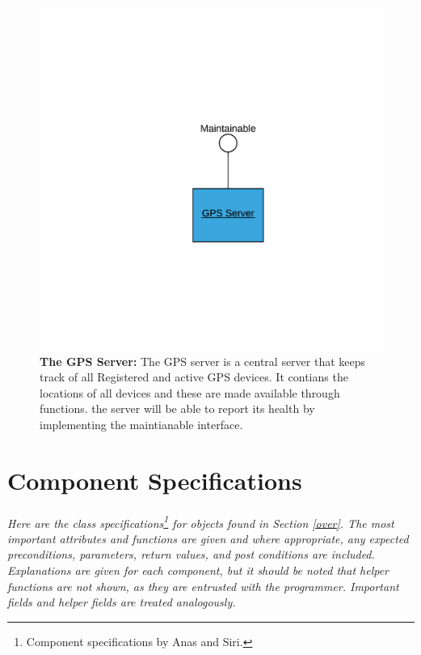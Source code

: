 \documentclass[12pt]{article}
\begin{document}
\begin{figure}[H]
    \centerline{\includegraphics[scale=.20]{GPSServer.png}}
    \caption{\textbf{The GPS Server: }The GPS server is a central server that keeps track of all Registered and active GPS devices. 
It contians the locations of all devices and these are made available through functions. the server will be able 
to report its health by implementing the maintianable interface.}
    \label{fig:GPSServer}
\end{figure}   

\section{Component Specifications} \label{specs}
\paragraph{} \textit{Here are the class specifications\footnote{Component specifications by Anas and Siri.} for objects 
found in Section \ref{over}. The most important attributes and functions are given and where appropriate, any expected 
preconditions, parameters, return values, and post conditions are included. Explanations are given for each component, but 
it should be noted that helper functions are not shown, as they are entrusted with the programmer. Important fields and helper
fields are treated analogously.}
\end{document}
